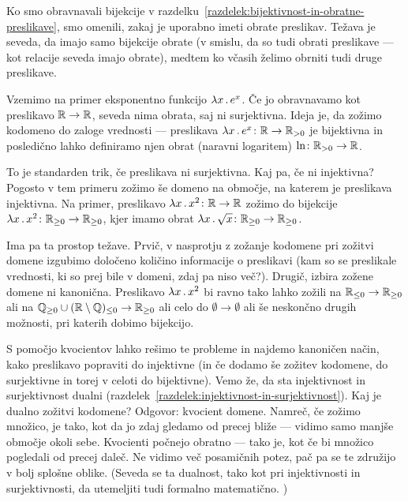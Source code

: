 
                Ko smo obravnavali bijekcije v razdelku~\ref{razdelek:bijektivnost-in-obratne-preslikave}, smo omenili, zakaj je uporabno imeti obrate preslikav. Težava je seveda, da imajo samo bijekcije obrate (v smislu, da so tudi obrati preslikave --- kot relacije seveda imajo obrate), medtem ko včasih želimo obrniti tudi druge preslikave.

                Vzemimo na primer eksponentno funkcijo $\xlam{x}{e^x}$. Če jo obravnavamo kot preslikavo $\mathbb{R} \to \mathbb{R}$, seveda nima obrata, saj ni surjektivna. Ideja je, da zožimo kodomeno do zaloge vrednosti --- preslikava $\xlam{x}{e^x}\colon \RR \to \RR_{> 0}$ je bijektivna in posledično lahko definiramo njen obrat (naravni logaritem) $\ln\colon \mathbb{R}_{> 0} \to \mathbb{R}$.

                To je standarden trik, če preslikava ni surjektivna. Kaj pa, če ni injektivna? Pogosto v tem primeru zožimo še domeno na območje, na katerem je preslikava injektivna. Na primer, preslikavo $\xlam{x}{x^2}\colon \RR \to \RR$ zožimo do bijekcije $\xlam{x}{x^2}\colon \RR_{\geq 0} \to \RR_{\geq 0}$, kjer imamo obrat $\xlam{x}{\sqrt{x}}\colon \RR_{\geq 0} \to \RR_{\geq 0}$.

                Ima pa ta prostop težave. Prvič, v nasprotju z zožanje kodomene pri zožitvi domene izgubimo določeno količino informacije o preslikavi (kam so se preslikale vrednosti, ki so prej bile v domeni, zdaj pa niso več?). Drugič, izbira zožene domene ni kanonična. Preslikavo $\xlam{x}{x^2}$ bi ravno tako lahko zožili na $\mathbb{R}_{\leq 0} \to \mathbb{R}_{\geq 0}$ ali na $\mathbb{Q}_{\geq 0} \cup (\mathbb{R} \setminus \mathbb{Q})_{\leq 0} \to \mathbb{R}_{\geq 0}$ ali celo do $\emptyset \to \emptyset$ ali še neskončno drugih možnosti, pri katerih dobimo bijekcijo.

                S pomočjo kvocientov lahko rešimo te probleme in najdemo kanoničen način, kako preslikavo popraviti do injektivne (in če dodamo še zožitev kodomene, do surjektivne in torej v celoti do bijektivne). Vemo že, da sta injektivnost in surjektivnost dualni (razdelek~\ref{razdelek:injektivnost-in-surjektivnost}). Kaj je dualno zožitvi kodomene? Odgovor: kvocient domene. Namreč, če zožimo množico, je tako, kot da jo zdaj gledamo od precej bliže --- vidimo samo manjše območje okoli sebe. Kvocienti počnejo obratno --- tako je, kot če bi množico pogledali od precej daleč. Ne vidimo več posamičnih potez, pač pa se te združijo v bolj splošne oblike. (Seveda se ta dualnost, tako kot pri injektivnosti in surjektivnosti, da utemeljiti tudi formalno matematično. )

